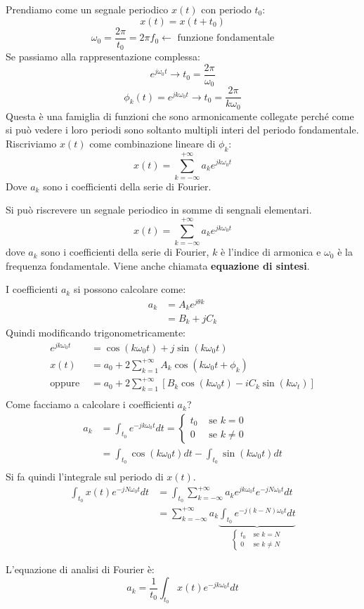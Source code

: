 \documentclass[a4paper]{article}
\begin{document}
Prendiamo come un segnale periodico $x(t)$ con periodo $t_0$:
\[x(t) = x(t + t_0)\]
\[\omega_0 = \frac{2\pi}{t_0} = 2\pi f_0 \leftarrow \text{ funzione fondamentale}\]
Se passiamo alla rappresentazione complessa:
\[e^{j\omega_0t} \rightarrow t_0 = \frac{2\pi}{\omega_0}\]
\[\phi_k(t) = e^{jk\omega_0 t} \rightarrow t_0 = \frac{2\pi}{k\omega_0}\]
Questa è una famiglia di funzioni che sono armonicamente collegate perché 
come si può vedere i loro periodi sono soltanto multipli interi del periodo fondamentale.
Riscriviamo $x(t)$ come combinazione lineare di $\phi_k$:
\[x(t) = \sum_{k = -\infty}^{+\infty} a_k e^{jk\omega_0 t}\]
Dove $a_k$ sono i coefficienti della serie di Fourier.
\begin{theorem}
    Si può riscrevere un segnale periodico in somme di sengnali elementari.
    \[x(t) = \sum_{k = -\infty}^{+\infty} a_k e^{jk\omega_0 t}\]
    dove $a_k$ sono i coefficienti della serie di Fourier, $k$ è l'indice di armonica e 
    $\omega_0$ è la frequenza fondamentale. Viene anche chiamata \textbf{equazione di sintesi}.
\end{theorem}
I coefficienti $a_k$ si possono calcolare come:
\begin{align*}
    a_k &= A_k e^{j\theta k}\\
    &= B_k + j C_k
\end{align*}
Quindi modificando trigonometricamente:
\begin{align*}
 e^{jk\omega_0 t} &= \cos(k\omega_0 t) + j\sin(k\omega_0 t)\\
 x(t) &= a_0 + 2\sum_{k = 1}^{+\infty} A_k \cos(k\omega_0 t + \phi_k)\\
 \text{oppure } &=   a_0 + 2\sum_{k = 1}^{+\infty} \left[B_k\cos(k\omega_0 t) - iC_k\sin(k\omega_t)\right]\\
\end{align*}
Come facciamo a calcolare i coefficienti $a_k$?
\begin{align*}
    a_k &= \int_{t_0} e^{-jk\omega_0 t} dt = \begin{cases}
        t_0 & \text{ se } k = 0\\
        0 & \text{ se } k \neq 0
    \end{cases}\\
    &= \int_{t_0} \cos(k\omega_0 t) dt - \int_{t_0} \sin(k\omega_0 t) dt\\
\end{align*}
Si fa quindi l'integrale sul periodo di $x(t)$.
\begin{align*}
    \int_{t_0} x(t) e^{-jN\omega_0 t} dt &= \int_{t_0} \sum_{k = -\infty}^{+\infty} a_k e^{jk\omega_0 t} e^{-jN\omega_0 t} dt\\
    &= \sum_{k = -\infty}^{+\infty} a_k  \underbrace{\int_{t_0} e^{-j(k - N)\omega_0 t} dt}_{\begin{cases}
        t_0 & \text{ se } k = N\\
        0 & \text{ se } k \neq N
    \end{cases}}
\end{align*}
\begin{theorem}
    L'equazione di analisi di Fourier è:
    \[a_k = \frac{1}{t_0} \int_{t_0} x(t) e^{-jk\omega_0 t} dt\]
\end{theorem}
\end{document}
